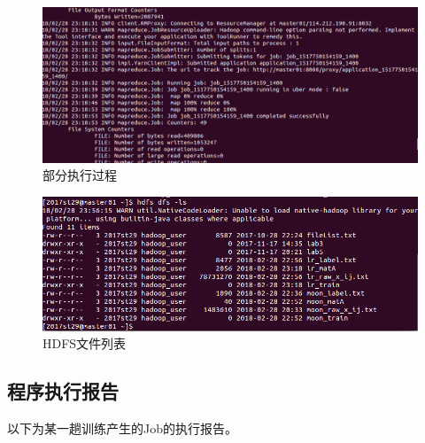 \documentclass[a4paper,UTF8]{article}
\theoremstyle{definition}
\begin{document}
\begin{figure}[H]
	\centering
	\includegraphics[width=\textwidth]{pic/run.png}
	\caption{部分执行过程}
\end{figure}
\begin{figure}[H]
	\centering
	\includegraphics[width=\textwidth]{pic/hdfs.png}
	\caption{HDFS文件列表}
\end{figure}

\subsection*{程序执行报告}

以下为某一趟训练产生的Job的执行报告。
\end{document}
